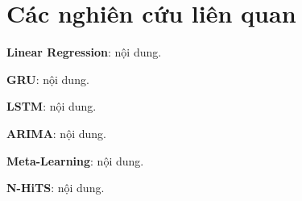 \section{Các nghiên cứu liên quan}
\textbf{Linear Regression}: nội dung.
\par
\textbf{GRU}: nội dung.
\par
\textbf{LSTM}: nội dung.
\par
\textbf{ARIMA}: nội dung.
\par
\textbf{Meta-Learning}: nội dung.
\par
\textbf{N-HiTS}: nội dung.

% 